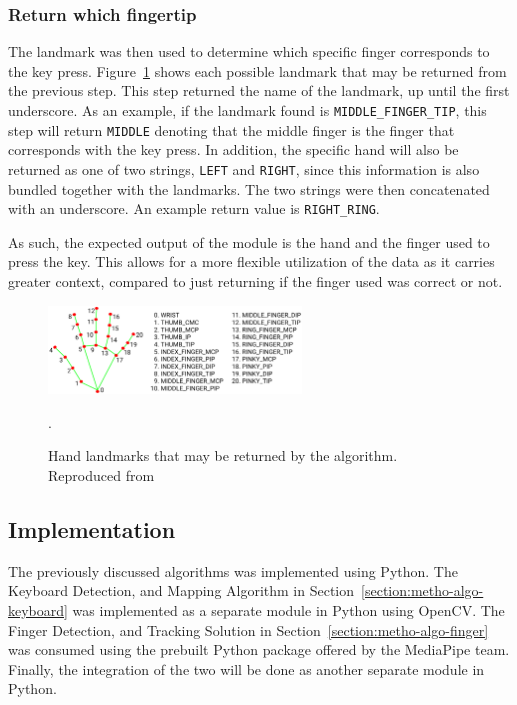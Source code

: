 \documentclass{report}
\begin{document}
\subsubsection{Return which fingertip}
The landmark was then used to determine which specific finger corresponds to the
key press. Figure~\ref{fig:metho-algo-integration-landmarks} shows each possible
landmark that may be returned from the previous step. This step returned the
name of the landmark, up until the first underscore. As an example, if the
landmark found is \texttt{MIDDLE\_FINGER\_TIP}, this step will return
\texttt{MIDDLE} denoting that the middle finger is the finger that corresponds
with the key press. In addition, the specific hand will also be returned as one
of two strings, \texttt{LEFT} and \texttt{RIGHT}, since this information is also
bundled together with the landmarks. The two strings were then concatenated with
an underscore. An example return value is \texttt{RIGHT\_RING}.

As such, the expected output of the module is the hand and the finger used to
press the key. This allows for a more flexible utilization of the data as it
carries greater context, compared to just returning if the finger used was
correct or not.

\begin{figure}[H]
	\centering
	\includegraphics[width=0.6\textwidth]{hand-landmarks.png}
	\caption{Hand landmarks that may be returned by the algorithm. Reproduced from }.
	\label{fig:metho-algo-integration-landmarks}
	\centering
\end{figure}

\subsection{Implementation}
\label{section:metho-algo-implementation}
The previously discussed algorithms was implemented using Python. The Keyboard
Detection, and Mapping Algorithm in Section~\ref{section:metho-algo-keyboard}
was implemented as a separate module in Python using OpenCV. The Finger
Detection, and Tracking Solution in Section~\ref{section:metho-algo-finger} was
consumed using the prebuilt Python package offered by the MediaPipe team.
Finally, the integration of the two will be done as another separate module
in Python.
\end{document}
